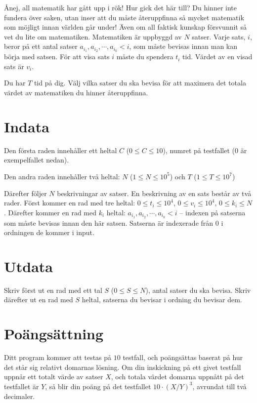 
Ånej, all matematik har gått upp i rök! Hur gick det här till? Du hinner inte fundera över saken, 
utan inser att du måste återuppfinna så mycket matematik som möjligt innan världen går under!
Även om all faktisk kunskap försvunnit så vet du lite om matematiken. 
Matematiken är uppbyggd av $N$ satser. Varje sats, $i$, beror på ett antal satser $a_{i_1}, a_{i_2}, \cdots, a_{i_k} < i$, 
som måste bevisas innan man kan börja med satsen. För att visa sats $i$ måste du spendera $t_i$ tid. 
Värdet av en visad sats är $v_i$.

Du har $T$ tid på dig. Välj vilka satser du ska bevisa för att maximera det totala värdet av matematiken du hinner återuppfinna.
\section*{Indata}
Den första raden innehåller ett heltal $C$ ($0 \leq C \leq 10$), numret på testfallet ($0$ är exempelfallet nedan).

Den andra raden innehåller två heltal: $N$ ($1 \le N \le 10^5$) och $T$ ($1 \le T \le 10^7$)

Därefter följer $N$ beskrivningar av satser.
En beskrivning av en sats består av två rader. Först kommer en rad med tre heltal: $0 \le t_i \le 10^4$, $0 \le v_i \le 10^4$, $0 \le k_i \le N$. 
Därefter kommer en rad med $k_i$ heltal: $a_{i_1}, a_{i_2}, \cdots, a_{i_k} < i$ -- indexen på satserna som måste bevisas innan den här satsen.
Satserna är indexerade från 0 i ordningen de kommer i input.

\section*{Utdata}
Skriv först ut en rad med ett tal $S$ ($0 \le S \le N$), antal satser du ska bevisa. Skriv därefter ut en rad med $S$ heltal, satserna du bevisar i ordning du bevisar dem.

\section*{Poängsättning}
Ditt program kommer att testas på $10$ testfall, och poängsättas baserat på hur det står sig relativt domarnas lösning.
Om din inskickning på ett givet testfall uppnår ett totalt värde av satser $X$, och totala värdet domarna uppnått på det testfallet är $Y$,
så blir din poäng på det testfallet $10 \cdot (X / Y)^3$, avrundat till två decimaler.

